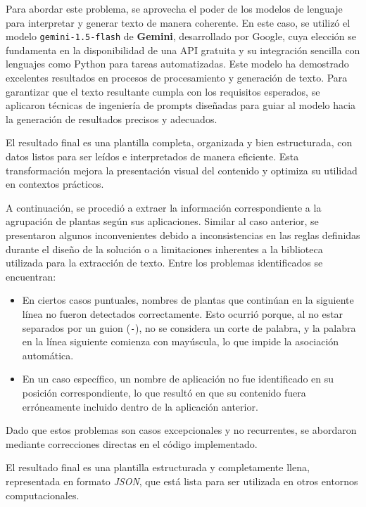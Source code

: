 Para abordar este problema, se aprovecha el poder de los modelos de lenguaje para interpretar y 
generar texto de manera coherente. En este caso, se utilizó el modelo \texttt{gemini-1.5-flash} de \textbf{Gemini}, desarrollado por Google, 
cuya elección se fundamenta en la disponibilidad de una API gratuita y su integración sencilla con lenguajes 
como Python para tareas automatizadas. Este modelo ha demostrado excelentes resultados en procesos de 
procesamiento y generación de texto. Para garantizar que el texto resultante cumpla con los requisitos esperados, 
se aplicaron técnicas de ingeniería de prompts diseñadas para guiar al modelo hacia la generación de resultados 
precisos y adecuados.

El resultado final es una plantilla completa, organizada y bien estructurada, con datos listos para ser leídos 
e interpretados de manera eficiente. Esta transformación mejora la presentación visual del contenido  
y optimiza su utilidad en contextos prácticos.

A continuación, se procedió a extraer la información correspondiente a la agrupación de plantas según sus aplicaciones. 
Similar al caso anterior, se presentaron algunos inconvenientes debido a inconsistencias en las reglas definidas 
durante el diseño de la solución o a limitaciones inherentes a la biblioteca utilizada para la extracción de texto. 
Entre los problemas identificados se encuentran:
 
\begin{itemize}
    \item En ciertos casos puntuales, nombres de plantas que continúan en la siguiente línea no fueron 
    detectados correctamente. Esto ocurrió porque, al no estar separados por un guion (\texttt{-}), 
    no se considera un corte de palabra, y la palabra en la línea siguiente comienza con mayúscula, 
    lo que impide la asociación automática.
    \item En un caso específico, un nombre de aplicación no fue identificado en su posición correspondiente, 
    lo que resultó en que su contenido fuera erróneamente incluido dentro de la aplicación anterior.
\end{itemize}

Dado que estos problemas son casos excepcionales y no recurrentes, se abordaron mediante correcciones 
directas en el código implementado.

El resultado final es una plantilla estructurada y completamente llena, representada en formato \textit{JSON}, 
que está lista para ser utilizada en otros entornos computacionales. 



